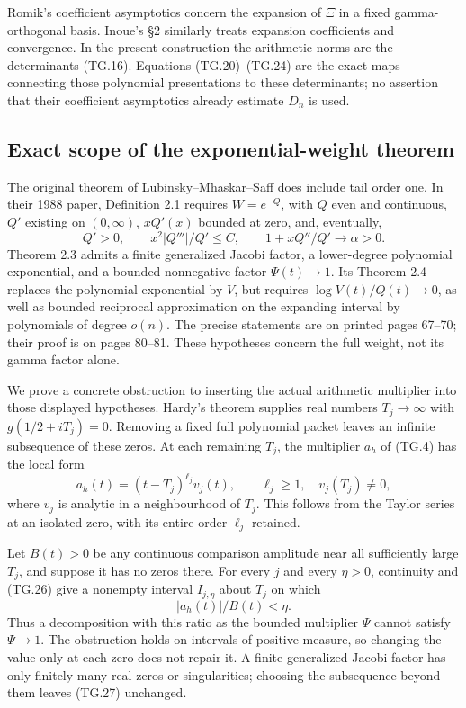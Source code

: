 \documentclass[11pt,a4paper]{article}
\begin{document}
Romik's coefficient asymptotics concern the expansion of \(\Xi\)
in a fixed gamma-orthogonal basis.  Inoue's \S2 similarly treats
expansion coefficients and convergence.  In the present construction
the arithmetic norms are the determinants (TG.16).  Equations
(TG.20)--(TG.24) are the exact maps connecting those polynomial
presentations to these determinants; no assertion that their
coefficient asymptotics already estimate \(D_n\) is used.

\subsection{Exact scope of the exponential-weight theorem}

The original theorem of Lubinsky--Mhaskar--Saff does include tail
order one.  In their 1988 paper, Definition 2.1 requires
\(W=e^{-Q}\), with \(Q\) even and continuous, \(Q'\) existing
on \((0,\infty)\), \(xQ'(x)\) bounded at zero, and, eventually,
\[
 Q'>0,\qquad x^2|Q'''|/Q'\leq C,\qquad
            1+xQ''/Q'\longrightarrow\alpha>0.
                                                               \tag{TG.25}
\]
Theorem 2.3 admits a finite generalized Jacobi factor, a lower-degree
polynomial exponential, and a bounded nonnegative factor
\(\Psi(t)\to1\).  Its Theorem 2.4 replaces the polynomial
exponential by \(V\), but requires
\(\log V(t)/Q(t)\to0\), as well as bounded reciprocal
approximation on the expanding interval by polynomials of degree
\(o(n)\).  The precise statements are on printed pages 67--70;
their proof is on pages 80--81.  These hypotheses concern the
full weight, not its gamma factor alone.

We prove a concrete obstruction to inserting the actual arithmetic
multiplier into those displayed hypotheses.  Hardy's theorem
supplies real numbers \(T_j\to\infty\) with
\(g(1/2+iT_j)=0\).  Removing a fixed full polynomial packet
leaves an infinite subsequence of these zeros.  At each remaining
\(T_j\), the multiplier \(a_h\) of (TG.4) has the local form
\[
 a_h(t)=(t-T_j)^{\ell_j}v_j(t),\qquad
 \ell_j\geq1,\quad v_j(T_j)\ne0,
                                                               \tag{TG.26}
\]
where \(v_j\) is analytic in a neighbourhood of \(T_j\).
This follows from the Taylor series at an isolated zero, with its
entire order \(\ell_j\) retained.

Let \(B(t)>0\) be any continuous comparison amplitude near all
sufficiently large \(T_j\), and suppose it has no zeros there.
For every \(j\) and every \(\eta>0\), continuity and (TG.26)
give a nonempty interval \(I_{j,\eta}\) about \(T_j\) on which
\[
                 |a_h(t)|/B(t)<\eta.
                                                               \tag{TG.27}
\]
Thus a decomposition with this ratio as the bounded multiplier
\(\Psi\) cannot satisfy \(\Psi\to1\).  The obstruction
holds on intervals of positive measure, so changing the value only
at each zero does not repair it.  A finite generalized Jacobi
factor has only finitely many real zeros or singularities; choosing
the subsequence beyond them leaves (TG.27) unchanged.
\end{document}
